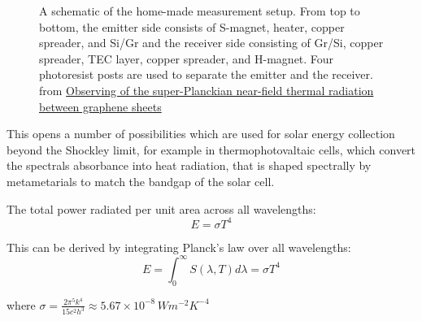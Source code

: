 \documentclass[
  a4paper,
]{book}
\begin{document}
\begin{tcolorbox}
\begin{figure}[H]
\caption{\label{fig-superplanck-radiation}A schematic of the home-made
measurement setup. From top to bottom, the emitter side consists of
S-magnet, heater, copper spreader, and Si/Gr and the receiver side
consisting of Gr/Si, copper spreader, TEC layer, copper spreader, and
H-magnet. Four photoresist posts are used to separate the emitter and
the receiver. from
\href{https://www.nature.com/articles/s41467-018-06163-8}{Observing of
the super-Planckian near-field thermal radiation between graphene
sheets}}

\end{figure}%

This opens a number of possibilities which are used for solar energy
collection beyond the Shockley limit, for example in thermophotovaltaic
cells, which convert the spectrals absorbance into heat radiation, that
is shaped spectrally by metametarials to match the bandgap of the solar
cell.

\end{tcolorbox}

\begin{tcolorbox}[enhanced jigsaw, coltitle=black, title=\textcolor{quarto-callout-note-color}{\faInfo}\hspace{0.5em}{Stefan-Boltzmann Law}, colframe=quarto-callout-note-color-frame, toprule=.15mm, opacitybacktitle=0.6, left=2mm, opacityback=0, breakable, toptitle=1mm, bottomtitle=1mm, leftrule=.75mm, arc=.35mm, titlerule=0mm, colbacktitle=quarto-callout-note-color!10!white, rightrule=.15mm, bottomrule=.15mm, colback=white]

The total power radiated per unit area across all wavelengths:
\[E = \sigma T^4\]

This can be derived by integrating Planck's law over all wavelengths:
\[E = \int_0^\infty S(\lambda,T) d\lambda = \sigma T^4\]

where
\(\sigma = \frac{2\pi^5k^4}{15c^2h^3} \approx 5.67 \times 10^{-8}\, W m^{-2} K^{-4}\)

\end{tcolorbox}
\end{document}

